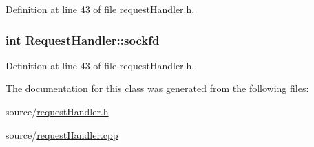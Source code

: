 Definition at line 43 of file request\+Handler.\+h.

\subsubsection[{\texorpdfstring{sockfd}{sockfd}}]{\setlength{\rightskip}{0pt plus 5cm}int Request\+Handler\+::sockfd\hspace{0.3cm}{\ttfamily [private]}}\hypertarget{class_request_handler_a6f7f37ba12f014dafca8cb78cff298c8}{}\label{class_request_handler_a6f7f37ba12f014dafca8cb78cff298c8}


Definition at line 43 of file request\+Handler.\+h.



The documentation for this class was generated from the following files\+:\begin{DoxyCompactItemize}
\item 
source/\hyperlink{request_handler_8h}{request\+Handler.\+h}\item 
source/\hyperlink{request_handler_8cpp}{request\+Handler.\+cpp}\end{DoxyCompactItemize}

